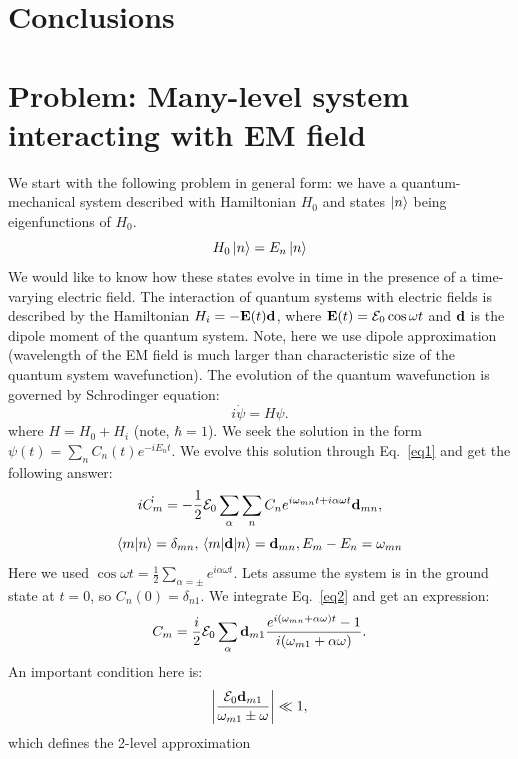 \documentclass[twocolumn,superscriptaddress,unsortedaddress,
 amsmath,amssymb,
 aps,
]{revtex4-2}
\begin{document}
\section{Conclusions} %

\section{\label{sec:level1}Problem: Many-level system interacting with EM field}

We start with the following problem in general form: we have a quantum-mechanical system described with Hamiltonian $H_0$ and states $\ket{n}$ being eigenfunctions of $H_0$.
\begin{equation*}
H_0 \ket{n} = E_n \ket{n}
\end{equation*}
We would like to know how these states evolve in time in the presence of a time-varying electric field. The interaction of quantum systems with electric fields is described by the Hamiltonian $ H_i = - \vb{E}(t) \vb{d}$, where $\vb{E}(t) = \vb{\mathcal{E}}_0 \cos \omega t$ and $\vb{d}$ is the dipole moment of the quantum system. Note, here we use dipole approximation (wavelength of the EM field is much larger than characteristic size of the quantum system wavefunction). The evolution of the quantum wavefunction is governed by Schrodinger equation:
\begin{equation}
 i \dot{\psi} = H \psi
\label{eq1}.
\end{equation}
where $H = H_0 + H_i$ (note, $\hbar = 1$). We seek the solution in the form $\psi(t) = \sum_n C_n(t) e^{-i E_n t}$. We evolve this solution through Eq.~\ref{eq1} and get the following answer:
\begin{equation}
 i \dot{C_m} = -\frac{1}{2} \vb{\mathcal{E}}_0 \sum_{\alpha} \sum_{n} C_n e^{i \omega_{mn} t + i \alpha \omega t} \vb{d}_{mn}
\label{eq2},
\end{equation}
\begin{equation}
 \braket{m}{n} = \delta_{mn}, \mel{m}{\vb{d}}{n} = \vb{d}_{mn}, E_m - E_n = \omega_{mn}
\end{equation}
Here we used $\cos \omega t = \frac{1}{2} \sum_{\alpha = \pm} e^{i \alpha \omega t}$. Lets assume the system is in the ground state at $t = 0$, so $C_n(0) = \delta_{n1}$. We integrate Eq.~\ref{eq2} and get an expression:
\begin{equation}
 C_m = \frac{i}{2} \vb{\mathcal{E}}_0 \sum_{\alpha} \vb{d}_{m1} \frac{e^{i (\omega_{mn} + \alpha \omega) t} - 1}{i (\omega_{m1} + \alpha \omega)} 
\label{eq3}.
\end{equation}
An important condition here is:
\begin{equation}
\abs{\frac{\vb{\mathcal{E}}_0 \vb{d}_{m1}}{\omega_{m1} \pm \omega}} \ll 1
\label{eq4},
\end{equation}
which defines the 2-level approximation
\end{document}
